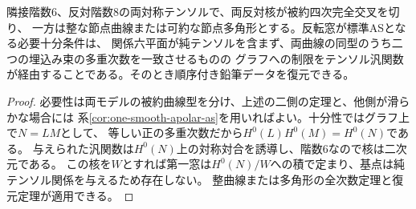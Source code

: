 \begin{corollary}\label{cor:reduced-polygon-window-test}
隣接階数6、反対階数8の両対称テンソルで、両反対核が被約四次完全交叉を切り、
一方は整な節点曲線または可約な節点多角形とする。反転窓が標準ASとなる必要十分条件は、
関係六平面が純テンソルを含まず、両曲線の同型のうち二つの埋込み束の多重次数を一致させるものの
グラフへの制限をテンソル汎関数が経由することである。そのとき順序付き鉛筆データを復元できる。
\end{corollary}
\begin{proof}
必要性は両モデルの被約曲線型を分け、上述の二側の定理と、他側が滑らかな場合には
系\ref{cor:one-smooth-apolar-as}を用いればよい。十分性ではグラフ上で$N=LM$として、
等しい正の多重次数だから$H^0(L)H^0(M)=H^0(N)$である。
与えられた汎関数は$H^0(N)$上の対称対合を誘導し、階数6なので核は二次元である。
この核を$W$とすれば第一窓は$H^0(N)/W$への積で定まり、基点は純テンソル関係を与えるため存在しない。
整曲線または多角形の全次数定理と復元定理が適用できる。
\end{proof}
